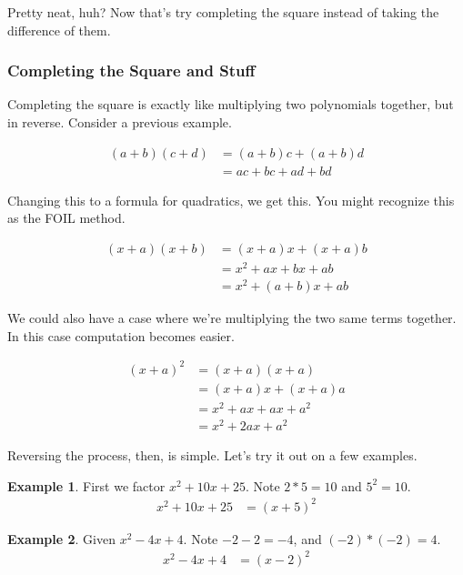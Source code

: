 \documentclass{scrbook}
\theoremstyle{definition}
\newtheorem{example}{Example}
\begin{document}
Pretty neat, huh? Now that's try completing the square instead of taking the difference of them.

\subsubsection{Completing the Square and Stuff}

Completing the square is exactly like multiplying two polynomials together, but in reverse. Consider a previous example.

\begin{align*}
  (a + b)(c + d) &= (a + b)c + (a + b)d\\
  &= ac + bc + ad + bd
\end{align*}

Changing this to a formula for quadratics, we get this. You might recognize this as the FOIL method.

\begin{align*}
  (x + a)(x + b) &= (x + a)x + (x + a)b\\
  &= x^2 + ax + bx + ab\\
  &= x^2 + (a + b)x + ab
\end{align*}

We could also have a case where we're multiplying the two same terms together. In this case computation becomes easier.

\begin{align*}
  (x + a)^2 &= (x + a)(x + a) \\ 
  &= (x + a)x + (x + a)a\\
  &= x^2 + ax + ax + a^2\\
  &= x^2 + 2ax + a^2
\end{align*}

Reversing the process, then, is simple. Let's try it out on a few examples.

\begin{example}
  First we factor $x^2 + 10x + 25$. Note $2 * 5 = 10$ and $5^2 = 10$. 
  \begin{align*}
    x^2 + 10x + 25 &= (x + 5)^2
  \end{align*}
\end{example}

\begin{example}
  Given $x^2 - 4x + 4$. Note $-2 -2 = -4$, and $(-2) * (-2) = 4$. 
  \begin{align*}
    x^2 -4x +4 &= (x - 2)^2
  \end{align*}
\end{example}
\end{document}
